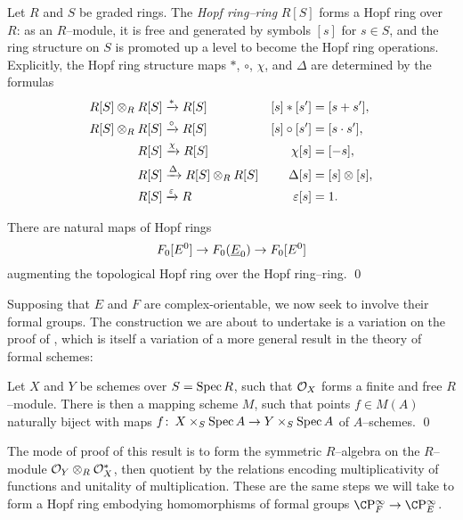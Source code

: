 \begin{definition}
Let \(R\) and \(S\) be graded rings.  The \textit{Hopf ring--ring} \(R[S]\) forms a Hopf ring over \(R\): as an \(R\)--module, it is free and generated by symbols \([s]\) for \(s \in S\), and the ring structure on \(S\) is promoted up a level to become the Hopf ring operations.  Explicitly, the Hopf ring structure maps \(\ast\), \(\circ\), \(\chi\), and \(\Delta\) are determined by the formulas
\begin{align*}
R[S] \otimes_R R[S] & \xrightarrow{\ast} R[S] & [s] \ast [s'] & = [s + s'], \\
R[S] \otimes_R R[S] & \xrightarrow{\circ} R[S] & [s] \circ [s'] & = [s \cdot s'], \\
R[S] & \xrightarrow{\chi} R[S] & \chi [s] & = [-s], \\
R[S] & \xrightarrow{\Delta} R[S] \otimes_R R[S] & \Delta [s] & = [s] \otimes [s], \\
R[S] & \xrightarrow{\varepsilon} R & \varepsilon[s] & = 1.
\end{align*}
\end{definition}

\begin{lemma}
There are natural maps of Hopf rings \[F_0[E^0] \to F_0(\OS{E}{0}) \to F_0[E^0]\] augmenting the topological Hopf ring over the Hopf ring--ring. \qed
\end{lemma}

Supposing that \(E\) and \(F\) are complex-orientable, we now seek to involve their formal groups.  The construction we are about to undertake is a variation on the proof of , which is itself a variation of a more general result in the theory of formal schemes:
\begin{lemma}\label{MappingSchemeStatement}
Let \(X\) and \(Y\) be schemes over \(S = \operatorname{Spec} R\), such that \(\mathcal{O}_X\) forms a finite and free \(R\)--module.  There is then a mapping scheme \(M\), such that points \(f \in M(A)\) naturally biject with maps \(f\colon\thinspace X \times_S \operatorname{Spec} A \to Y \times_S \operatorname{Spec} A\) of \(A\)--schemes. \qed
\end{lemma}

\noindent The mode of proof of this result is to form the symmetric \(R\)--algebra on the \(R\)--module \(\mathcal{O}_Y \otimes_R \mathcal{O}_X^*\), then quotient by the relations encoding multiplicativity of functions and unitality of multiplication.  These are the same steps we will take to form a Hopf ring embodying homomorphisms of formal groups \(\CP^\infty_F \to \CP^\infty_E\).

